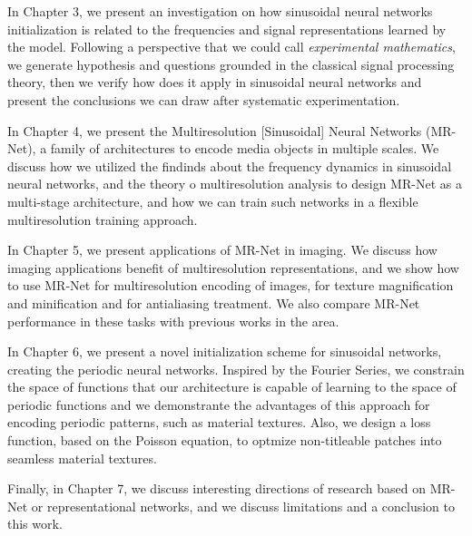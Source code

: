 In Chapter 3, we present an investigation on how sinusoidal neural networks initialization is related to the frequencies and signal representations learned by the model. Following a perspective that we could call \textit{experimental mathematics}, we generate hypothesis and questions grounded in the classical signal processing theory, then we verify how does it apply in sinusoidal neural networks and present the conclusions we can draw after systematic experimentation.

In Chapter 4, we present the Multiresolution [Sinusoidal] Neural Networks (MR-Net), a family of architectures to encode media objects in multiple scales. We discuss how we utilized the findinds about the frequency dynamics in sinusoidal neural networks, and the theory o multiresolution analysis to design MR-Net as a multi-stage architecture, and how we can train such networks in a flexible multiresolution training approach.

In Chapter 5, we present applications of MR-Net in imaging. We discuss how imaging applications benefit of multiresolution representations, and we show how to use MR-Net for multiresolution encoding of images, for texture magnification and minification and for antialiasing treatment. We also compare MR-Net performance in these tasks with previous works in the area.

In Chapter 6, we present a novel initialization scheme for sinusoidal networks, creating the periodic neural networks. Inspired by the Fourier Series, we constrain the space of functions that our architecture is capable of learning to the space of periodic functions and we demonstrante the advantages of this approach for encoding periodic patterns, such as material textures. Also, we design a loss function, based on the Poisson equation, to optmize non-titleable patches into seamless material textures.

Finally, in Chapter 7, we discuss interesting directions of research based on MR-Net or representational networks, and we discuss limitations and a conclusion to this work.

